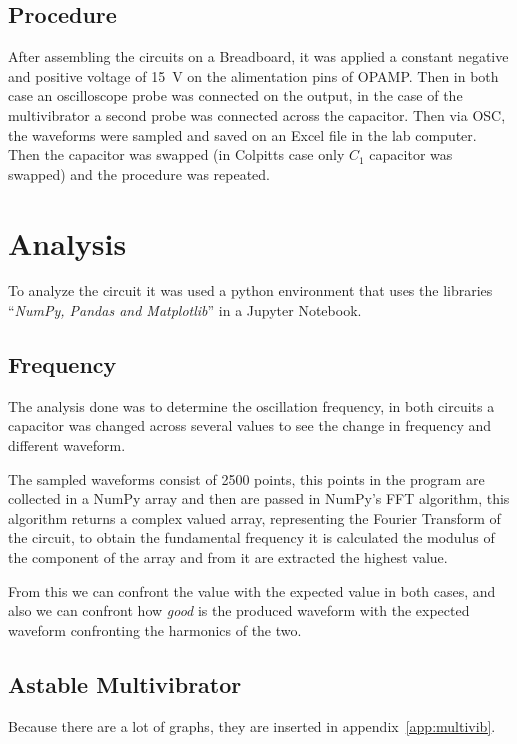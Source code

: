 \documentclass[a4paper, twocolumn]{article}
\begin{document}
\subsection{Procedure}

After assembling the circuits on a Breadboard, it was applied a constant negative and positive voltage of \SI{15}{\volt} on the alimentation pins of OPAMP. Then in both case an oscilloscope probe was connected on the output, in the case of the multivibrator a second probe was connected across the capacitor.  Then via OSC, the waveforms were sampled and saved on an Excel file in the lab computer. 
Then the capacitor was swapped (in Colpitts case only $C_1$ capacitor was swapped) and the procedure was repeated.

\section{Analysis}

To analyze the circuit it was used a python environment that uses the libraries ``\emph{NumPy, Pandas and Matplotlib}'' in a Jupyter Notebook. 


\subsection{Frequency}

The analysis done was to determine the oscillation frequency, in both circuits a capacitor was changed across several values to see the change in frequency and different waveform.

The sampled waveforms consist of 2500 points, this points in the program are collected in a NumPy array and then are passed in NumPy's FFT algorithm, this algorithm returns a complex valued array, representing the Fourier Transform of the circuit, to obtain the fundamental frequency it is calculated the modulus of the component of the array and from it are extracted the highest value.

From this we can confront the value with the expected value in both cases, and also we can confront how \emph{good} is the produced waveform with the expected waveform confronting the harmonics of the two.

\subsection{Astable Multivibrator}

Because there are a lot of graphs, they are inserted in appendix~\ref{app:multivib}.
\end{document}
